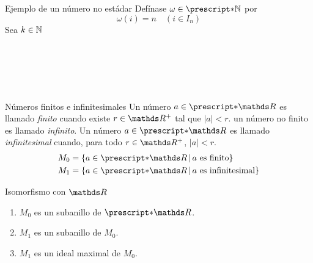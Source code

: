 \documentclass{beamer}
\begin{document}
\begin{frame}{Ejemplo de un número no estádar}
  Defínase $\omega \in \st{\N}$ por
  \[\omega(i) = n\quad (i\in I_n)\]
  Sea $k\in\mathbb{N}$
  \begin{longderivation}
      \\
    \equiv\\
      \\
    \equiv\\
  \end{longderivation}
\end{frame}
\begin{frame}{Números finitos e infinitesimales}
    Un número $a\in\st{\R}$ es llamado \emph{finito} cuando existe
    $r\in\R^+$ tal que $|a|<r$. un número no finito es llamado \emph{infinito}.
    Un número $a\in\st{\R}$ es llamado \emph{infinitesimal} cuando,
    para todo $r\in\R^+$, $|a|<r$.
    \begin{align*}
      M_0 &= \set{a\in\st{\R}}{a \text{ es finito}}\\
      M_1 &= \set{a\in\st{\R}}{a \text{ es infinitesimal}}
    \end{align*}
\end{frame}
\begin{frame}{Isomorfismo con $\R$}
  \begin{enumerate}
    \item $M_0$ es un subanillo de $\st{\R}$.
    \item $M_1$ es un subanillo de $M_0$.
    \item $M_1$ es un ideal maximal de $M_0$.
  \end{enumerate}
  \begin{itemize}
  \end{itemize}
\end{frame}
\end{document}
